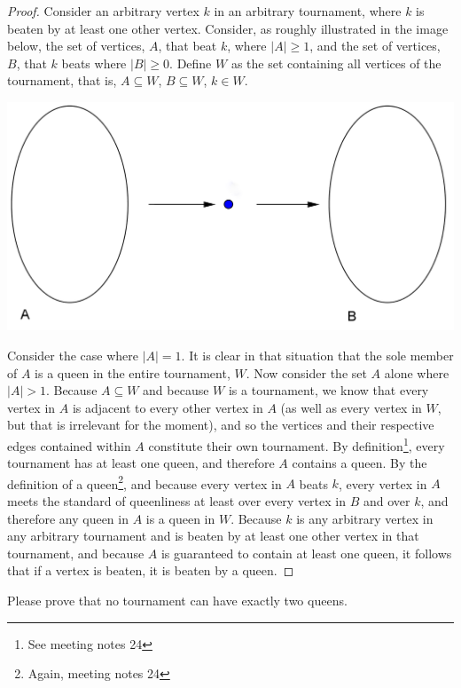 \documentclass[12pt]{article}
\newenvironment{problem}[2][Problem]{\begin{trivlist}
\item[\hskip \labelsep {\bfseries #1}\hskip \labelsep {\bfseries #2.}]}{\end{trivlist}}
\begin{document}
\begin{proof}
Consider an arbitrary vertex $k$ in an arbitrary tournament, where $k$ is beaten by at least one other vertex. Consider, as roughly illustrated in the image below, the set of vertices, $A$, that beat $k$, where $|A|\geq1$, and the set of vertices, $B$, that $k$ beats where $|B|\geq0$. Define $W$ as the set containing all vertices of the tournament, that is, $A \subseteq W$, $B \subseteq W$, $k \in W$. \\
\begin{center}
\includegraphics[scale=0.8]{Prob_1.png}
\end{center}
Consider the case where $|A|=1$. It is clear in that situation that the sole member of $A$ is a queen in the entire tournament, $W$. Now consider the set $A$ alone where $|A| > 1$. Because $A\subseteq W$ and because $W$ is a tournament, we know that every vertex in $A$ is adjacent to every other vertex in $A$ (as well as every vertex in $W$, but that is irrelevant for the moment), and so the vertices and their respective edges contained within $A$ constitute their own tournament. By definition\footnote{See meeting notes 24}, every tournament has at least one queen, and therefore $A$ contains a queen. By the definition of a queen\footnote{Again, meeting notes 24}, and because every vertex in $A$ beats $k$, every vertex in $A$ meets the standard of queenliness at least over every vertex in $B$ and over $k$, and therefore any queen in $A$ is a queen in $W$. Because $k$ is any arbitrary vertex in any arbitrary tournament and is beaten by at least one other vertex in that tournament, and because $A$ is guaranteed to contain at least one queen, it follows that if a vertex is beaten, it is beaten by a queen. 
\end{proof}

\begin{problem}{2}
Please prove that no tournament can have exactly two queens.
\end{problem}
 
\end{document}
